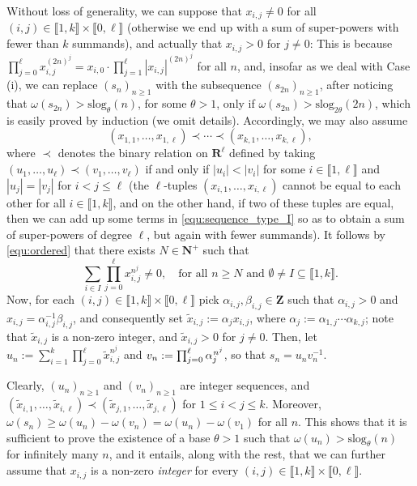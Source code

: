 \documentclass[reqno]{amsart}
\theoremstyle{remark}
\providecommand{\NNb}{\mathbf{N}}
\providecommand{\RRb}{\mathbf{R}}
\providecommand{\ZZb}{\mathbf{Z}}
\providecommand\llb{\llbracket}
\providecommand\rrb{\rrbracket}
\newcommand{\fixed}[2][1]{%
  \begingroup
  \spaceskip=#1\fontdimen2\font minus \fontdimen4\font
  \xspaceskip=0pt\relax
  #2%
  \endgroup
}
\begin{document}
Without loss of generality, we can suppose that $x_{i,j} \ne 0$ for all $(i,j) \in \llb 1, k \rrb \times \llb 0, \ell \rrb$ (otherwise we end up with a sum of super-powers with fewer than $k$ summands), and actually that $x_{i,j} > 0$ for $j \ne 0$: This is because $\prod_{j=0}^\ell x_{i,j}^{(2n)^j} = x_{i,0} \cdot \prod_{j=1}^\ell |x_{i,j}|^{(2n)^j}$ for all $n$, and, insofar as we deal with Case (i), we can replace $(s_n)_{n \ge 1}$ with the subsequence $(s_{2n})_{n \ge 1}$, after noticing that $\omega(s_{2n}) > \text{slog}_\theta(n)$, for some $\theta > 1$, only if $\omega(s_{2n}) > \text{slog}_{2\theta}(2n)$, which is easily proved by induction (we omit details). Accordingly, we may also assume
\begin{equation}
\label{equ:ordered}
(x_{1,1},\ldots,x_{1,\ell}) \prec \cdots \prec (x_{k,1},\ldots,x_{k,\ell}),
\end{equation}
where $\prec$ denotes the binary relation on $\RRb^\ell$ defined by taking $(u_1, \ldots, u_\ell) \prec (v_1, \ldots, v_\ell)$ if and only if $|u_i| < |v_i|$ for some $i \in \llb 1, \ell \rrb$ and $|u_j| = |v_j|$ for $i < j \le \ell$ (the $\ell$-tuples $(x_{i,1},\ldots,x_{i,\ell})$ cannot be equal to each other for all $i \in \llb 1, k \rrb$, and on the other hand, if two of these tuples are equal, then we can add up some terms in \eqref{equ:sequence_type_I} so as to obtain a sum of super-powers of degree $\ell$, but again with fewer summands). It follows by \eqref{equ:ordered} that there exists $N \in \NNb^+$ such that
%
\begin{equation}
\label{equ:subsums}
\sum_{i \in I} \prod_{j=0}^\ell x_{i,j}^{n^j} \ne 0, \quad\text{for all } n \ge N \text{ and } \emptyset \ne I \subseteq \llb 1, k \rrb.
\end{equation}
%
Now, for each $(i,j) \in \llb 1, k \rrb \times \llb 0, \ell \rrb$ pick $\alpha_{i,j}, \beta_{i,j} \in \ZZb$ such that $\alpha_{i,j} > 0$ and $x_{i,j} = \alpha_{i,j}^{-1} \beta_{i,j}$, and consequently set
$\tilde{x}_{i,j} := \alpha_j x_{i,j}$, where $\alpha_j := \alpha_{1,j} \cdots \alpha_{k,j}$; note that $\tilde{x}_{i,j}$ is a non-zero integer, and $\tilde{x}_{i,j} > 0$ for $j \ne 0$. Then, let $
u_n := \sum_{i = 1}^k \prod_{j=0}^\ell \tilde{x}_{i,j}^{n^j}$
and $v_n := \prod_{j=0}^\ell \alpha_j^{\fixed[0.15]{\text{ }}n^j}$, so that $s_n = u_n v_n^{-1}$.

Clearly, $(u_n)_{n \ge 1}$ and $(v_n)_{n \ge 1}$ are integer sequences, and $(\tilde{x}_{i,1},\ldots,\tilde{x}_{i,\ell}) \prec (\tilde{x}_{j,1},\ldots,\tilde{x}_{j,\ell})$ for $1\le i < j \le k$. Moreover,
$\omega(s_n) \ge \omega(u_n) - \omega(v_n) = \omega(u_n) - \omega(v_1)$ for all $n$. This shows that it is sufficient to prove the existence of a base $\theta > 1$ such that $\omega(u_{n}) > \text{slog}_\theta(n)$ for infinitely many $n$, and it entails, along with the rest, that we can further assume that $x_{i,j}$ is a non-zero \textit{integer} for every $(i,j) \in \llb 1, k \rrb \times \llb 0, \ell \rrb$.
\end{document}
